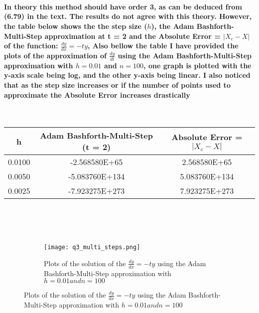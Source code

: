 \documentclass{article}
\begin{document}
\textbf{\\ \\ \\ In theory this method should have order 3, as can be deduced from (6.79) in the text. The results do not agree with this theory. However, the table below shows the the step size ($h$), the Adam Bashforth-Multi-Step approximation at  t = 2 and the  Absolute Error = $|X_c - X|$  of the function: $\frac{dy}{dx} = -ty$, Also bellow the table I have provided the plots of the approximation of $\frac{dy}{dt}$ using the Adam Bashforth-Multi-Step approximation with $h = 0.01$ and $n = 100$, one graph is plotted with the y-axis scale being log, and the other y-axis being linear. I also noticed that as the step size increases or if the number of points used to approximate the Absolute Error increases drastically\\ \\ \\}
 \begin{center}
\begin{tabular}{ |c|c|c| } 
 \hline \hline
h            & Adam Bashforth-Multi-Step (t = 2)  & Absolute Error = $|X_c - X|$ \\ 
 \hline \hline       
0.0100  &   -2.568580E+65   & 2.568580E+65 \\
\hline
0.0050  &   -5.083760E+134  & 5.083760E+134\\    
\hline
0.0025  &   -7.923275E+273  & 7.923275E+273\\
 \hline
\end{tabular}
\textbf{\\ \\ \\}
\begin{figure}[h!]
  \centering
  \begin{subfigure}{\linewidth}
    \texttt{[image: q3\_multi\_steps.png]}
    \caption{Plots of the solution of the $\frac{dy}{dx} = -ty$ using the Adam Bashforth-Multi-Step approximation with $h = 0.01 and n = 100$ }
  \end{subfigure}
\end{figure}
\end{center}
\pagebreak
\end{document}
